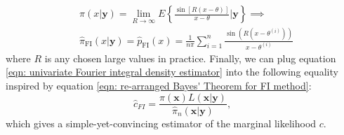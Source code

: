 \documentclass[%
 reprint,
 amsmath,amssymb,
 aps,
]{revtex4-2}
\def\ybold{\mathbf{y}}
\def\xbold{\mathbf{x}}
\begin{document}
\begin{align} \label{eqn: univariate Fourier integral density estimator}
    & \pi(x|\ybold) = \lim_{R \to \infty} E\left\{\frac{\sin[R(x-\theta)]}{x-\theta} \bigg|\ybold\right\} \implies \\ & \hat{\pi}_\text{FI}(x|\ybold) = \hat{p}_\text{FI}(x) = \frac{1}{n\pi}\sum_{i = 1}^n \frac{\sin(R(x - \theta^{(i)}))}{x - \theta^{(i)}}
\end{align}
where $R$ is any chosen large values in practice. Finally, we can plug equation \eqref{eqn: univariate Fourier integral density estimator} into the following equality inspired by equation \eqref{eqn: re-arranged Bayes' Theorem for FI method}:
\begin{equation} \label{eqn: re-arranged Bayes' Theorem for FI method estimator}
    \hat{c}_{FI} = \frac{\pi(\xbold)L(\xbold | \ybold)}{\hat{\pi}_n (\xbold | \ybold)},
\end{equation}
which gives a simple-yet-convincing estimator of the marginal likelihood $c$.
\end{document}
